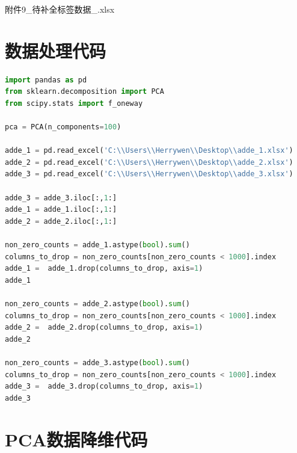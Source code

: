\documentclass{article}
\begin{document}
附件9\_待补全标签数据\_.xlsx

\appendix %

\section{数据处理代码}

\begin{lstlisting}[language=Python]
import pandas as pd
from sklearn.decomposition import PCA
from scipy.stats import f_oneway

pca = PCA(n_components=100)

adde_1 = pd.read_excel('C:\\Users\\Herrywen\\Desktop\\adde_1.xlsx')
adde_2 = pd.read_excel('C:\\Users\\Herrywen\\Desktop\\adde_2.xlsx')
adde_3 = pd.read_excel('C:\\Users\\Herrywen\\Desktop\\adde_3.xlsx')

adde_3 = adde_3.iloc[:,1:]
adde_1 = adde_1.iloc[:,1:]
adde_2 = adde_2.iloc[:,1:]

non_zero_counts = adde_1.astype(bool).sum()
columns_to_drop = non_zero_counts[non_zero_counts < 1000].index
adde_1 =  adde_1.drop(columns_to_drop, axis=1)
adde_1

non_zero_counts = adde_2.astype(bool).sum()
columns_to_drop = non_zero_counts[non_zero_counts < 1000].index
adde_2 =  adde_2.drop(columns_to_drop, axis=1)
adde_2

non_zero_counts = adde_3.astype(bool).sum()
columns_to_drop = non_zero_counts[non_zero_counts < 1000].index
adde_3 =  adde_3.drop(columns_to_drop, axis=1)
adde_3
\end{lstlisting}

\section{PCA数据降维代码}
\end{document}
